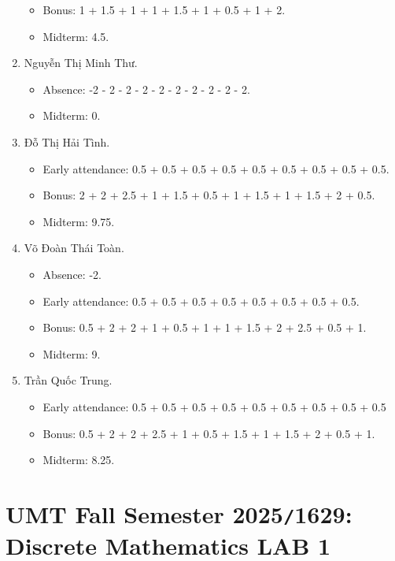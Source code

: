 \documentclass{article}
\begin{document}
\begin{enumerate}
\begin{itemize}
		\item Bonus: 1 + 1.5 + 1 + 1 + 1.5 + 1 + 0.5 + 1 + 2.
        \item Midterm: 4.5.
	\end{itemize}
	\item {\sc Nguyễn Thị Minh Thư.}
	\begin{itemize}
		\item Absence: -2 - 2 - 2 - 2 - 2 - 2 - 2 - 2 - 2 - 2.
        \item Midterm: 0.
	\end{itemize}
	\item {\sc Đỗ Thị Hải Tình.}
	\begin{itemize}
		\item Early attendance: 0.5 + 0.5 + 0.5 + 0.5 + 0.5 + 0.5 + 0.5 + 0.5 + 0.5.
		\item Bonus: 2 + 2 + 2.5 + 1 + 1.5 + 0.5 + 1 + 1.5 + 1 + 1.5 + 2 + 0.5.
        \item Midterm: 9.75.
	\end{itemize}
	\item {\sc Võ Đoàn Thái Toàn.}
	\begin{itemize}
		\item Absence: -2.
		\item Early attendance: 0.5 + 0.5 + 0.5 + 0.5 + 0.5 + 0.5 + 0.5 + 0.5.
		\item Bonus: 0.5 + 2 + 2 + 1 + 0.5 + 1 + 1 + 1.5 + 2 + 2.5 + 0.5 + 1.
        \item Midterm: 9.
	\end{itemize}
	\item {\sc Trần Quốc Trung.}
	\begin{itemize}
		\item Early attendance: 0.5 + 0.5 + 0.5 + 0.5 + 0.5 + 0.5 + 0.5 + 0.5 + 0.5
		\item Bonus: 0.5 + 2 + 2 + 2.5 + 1 + 0.5 + 1.5 + 1 + 1.5 + 2 + 0.5 + 1.
        \item Midterm: 8.25.
	\end{itemize}
\end{enumerate}


\section{UMT Fall Semester 2025{\tt/}1629: Discrete Mathematics LAB 1}
\end{document}
